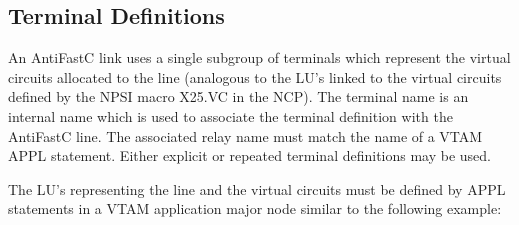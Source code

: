\documentclass[letterpaper,10pt,english]{sphinxmanual}
\begin{document}
\subsection{Terminal Definitions}
\label{\detokenize{connectivity_guide:index-80}}\label{\detokenize{connectivity_guide:id38}}
\sphinxAtStartPar
An AntiFastC link uses a single sub\sphinxhyphen{}group of terminals which represent the virtual circuits allocated to the line (analogous to the LU’s linked to the virtual circuits defined by the NPSI macro X25.VC in the NCP). The terminal name is an internal name which is used to associate the terminal definition with the AntiFastC line. The associated relay name must match the name of a VTAM APPL statement. Either explicit or repeated terminal definitions may be used.

\sphinxAtStartPar
{}

\sphinxAtStartPar
The LU’s representing the line and the virtual circuits must be defined by APPL statements in a VTAM application major node similar to the following example:
\end{document}
